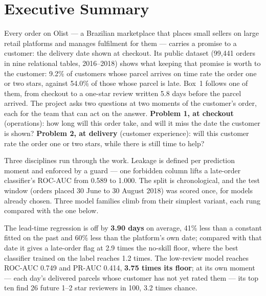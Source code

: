 \section*{Executive Summary}
\label{sec:executive}

Every order on Olist --- a Brazilian marketplace that places small sellers on
large retail platforms and manages fulfilment for them --- carries a promise to
a customer: the delivery date shown at checkout. Its public dataset (99{,}441
orders in nine relational tables, 2016--2018) shows what keeping that promise is
worth to the customer: 9.2\% of customers whose parcel arrives on time rate the
order one or two stars, against 54.0\% of those whose parcel is late. Box~1
follows one of them, from checkout to a one-star review written 5.8 days before
the parcel arrived. The project asks two questions at two moments of the
customer's order, each for the team that can act on the answer.
\textbf{Problem 1, at checkout} (operations): how long will this order take, and
will it miss the date the customer is shown? \textbf{Problem 2, at delivery}
(customer experience): will this customer rate the order one or two stars, while
there is still time to help?

Three disciplines run through the work. Leakage is defined per prediction moment
and enforced by a guard --- one forbidden column lifts a late-order classifier's
ROC-AUC from 0.589 to 1.000. The split is chronological,
and the test window (orders placed 30 June to 30 August 2018) was scored once,
for models already chosen. Three model families climb from their simplest
variant, each rung compared with the one below.

The lead-time regression is off by \textbf{3.90 days} on average, 41\% less than
a constant fitted on the past and 60\% less than the platform's own date;
compared with that date it gives a late-order flag at 2.9 times the no-skill
floor, where the best classifier trained on the label reaches 1.2 times. The
low-review model reaches ROC-AUC 0.749 and PR-AUC 0.414, \textbf{3.75 times its
floor}; at its own moment --- each day's delivered parcels whose customer has not
yet rated them --- its top ten find 26 future 1--2 star reviewers in 100, 3.2
times chance.


